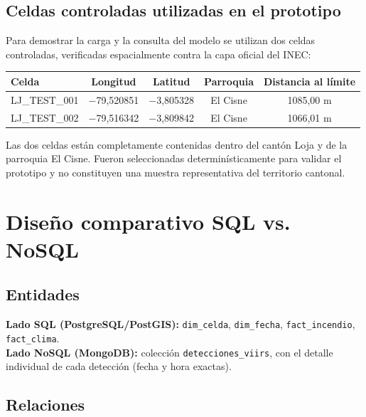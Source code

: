 \documentclass[11pt,a4paper]{article}
\begin{document}
\subsection*{Celdas controladas utilizadas en el prototipo}
\footnotesize
Para demostrar la carga y la consulta del modelo se utilizan dos celdas controladas, verificadas espacialmente contra la capa oficial del INEC:

\begin{center}
\small
\begin{tabular}{@{}lccc c@{}}
\toprule
\textbf{Celda} & \textbf{Longitud} & \textbf{Latitud} & \textbf{Parroquia} & \textbf{Distancia al l\'imite} \\
\midrule
LJ\_TEST\_001 & $-$79,520851 & $-$3,805328 & El Cisne & 1085,00 m \\
LJ\_TEST\_002 & $-$79,516342 & $-$3,809842 & El Cisne & 1066,01 m \\
\bottomrule
\end{tabular}
\end{center}

\vspace{0.1cm}
Las dos celdas est\'an completamente contenidas dentro del cant\'on Loja y de la parroquia El Cisne. Fueron seleccionadas determin\'isticamente para validar el prototipo y no constituyen una muestra representativa del territorio cantonal.
\normalsize

\section{Dise\~no comparativo SQL vs. NoSQL}

\subsection{Entidades}
\textbf{Lado SQL (PostgreSQL/PostGIS):} \texttt{dim\_celda}, \texttt{dim\_fecha}, \texttt{fact\_incendio}, \texttt{fact\_clima}.\\
\textbf{Lado NoSQL (MongoDB):} colecci\'on \texttt{detecciones\_viirs}, con el detalle individual de cada detecci\'on (fecha y hora exactas).

\subsection{Relaciones}
\end{document}
